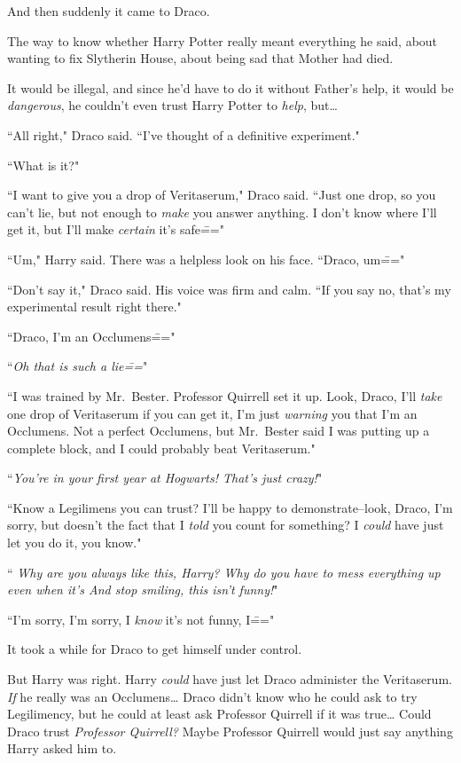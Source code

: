 And then suddenly it came to Draco.

The way to know whether Harry Potter really meant everything he said, about wanting to fix Slytherin House, about being sad that Mother had died.

It would be illegal, and since he'd have to do it without Father's help, it would be \emph{dangerous}, he couldn't even trust Harry Potter to \emph{help}, but{\ldots}

``All right," Draco said. ``I've thought of a definitive experiment."

``What is it?"

``I want to give you a drop of Veritaserum," Draco said. ``Just one drop, so you can't lie, but not enough to \emph{make} you answer anything. I don't know where I'll get it, but I'll make \emph{certain} it's safe\==="

``Um," Harry said. There was a helpless look on his face. ``Draco, um\==="

``Don't say it," Draco said. His voice was firm and calm. ``If you say no, that's my experimental result right there."

``Draco, I'm an Occlumens\==="

``\emph{Oh that is such a lie\===}"

``I was trained by Mr.~Bester. Professor Quirrell set it up. Look, Draco, I'll \emph{take} one drop of Veritaserum if you can get it, I'm just \emph{warning} you that I'm an Occlumens. Not a perfect Occlumens, but Mr.~Bester said I was putting up a complete block, and I could probably beat Veritaserum."

``\emph{You're in your first year at Hogwarts! That's just crazy!}"

``Know a Legilimens you can trust? I'll be happy to demonstrate\---look, Draco, I'm sorry, but doesn't the fact that I \emph{told} you count for something? I \emph{could} have just let you do it, you know."

``\emph{ Why are you always like this, Harry? Why do you have to mess everything up even when it's  And stop smiling, this isn't funny!}"

``I'm sorry, I'm sorry, I \emph{know} it's not funny, I\==="

It took a while for Draco to get himself under control.

But Harry was right. Harry \emph{could} have just let Draco administer the Veritaserum. \emph{If} he really was an Occlumens{\ldots} Draco didn't know who he could ask to try Legilimency, but he could at least ask Professor Quirrell if it was true{\ldots} Could Draco trust \emph{Professor Quirrell?} Maybe Professor Quirrell would just say anything Harry asked him to.

